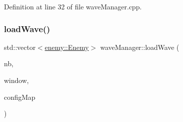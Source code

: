 Definition at line 32 of file wave\+Manager.\+cpp.

\mbox{\label{namespacewave_manager_a6e8847b12e8bc37292147f767d5676d2}} 
\subsubsection{\texorpdfstring{load\+Wave()}{loadWave()}}
{\footnotesize\ttfamily std\+::vector$<$\hyperlink{structenemy_1_1_enemy}{enemy\+::\+Enemy}$>$ wave\+Manager\+::load\+Wave (\begin{DoxyParamCaption}\item[{unsigned \&}]{nb,  }\item[{\hyperlink{class_min_g_l}{Min\+GL} \&}]{window,  }\item[{std\+::map$<$ std\+::string, std\+::string $>$ \&}]{config\+Map }\end{DoxyParamCaption})}

